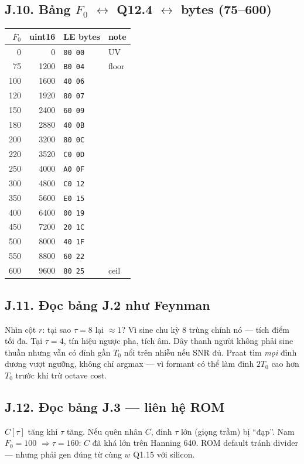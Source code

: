 \subsection*{J.10. Bảng $F_0$ $\leftrightarrow$ Q12.4 $\leftrightarrow$ bytes (75--600)}
\begin{center}\scriptsize
\begin{tabular}{@{}rrll@{}}
\toprule
$F_0$ & uint16 & LE bytes & note \\
\midrule
0 & 0 & \texttt{00 00} & UV \\
75 & 1200 & \texttt{B0 04} & floor \\
100 & 1600 & \texttt{40 06} &  \\
120 & 1920 & \texttt{80 07} &  \\
150 & 2400 & \texttt{60 09} &  \\
180 & 2880 & \texttt{40 0B} &  \\
200 & 3200 & \texttt{80 0C} &  \\
220 & 3520 & \texttt{C0 0D} &  \\
250 & 4000 & \texttt{A0 0F} &  \\
300 & 4800 & \texttt{C0 12} &  \\
350 & 5600 & \texttt{E0 15} &  \\
400 & 6400 & \texttt{00 19} &  \\
450 & 7200 & \texttt{20 1C} &  \\
500 & 8000 & \texttt{40 1F} &  \\
550 & 8800 & \texttt{60 22} &  \\
600 & 9600 & \texttt{80 25} & ceil \\
\bottomrule
\end{tabular}
\end{center}


\subsection*{J.11. Đọc bảng J.2 như Feynman}
Nhìn cột $r$: tại sao $\tau=8$ lại $\approx1$? Vì sine chu kỳ 8 trùng chính nó --- tích điểm tối đa. Tại $\tau=4$, tín hiệu ngược pha, tích âm. Dây thanh người không phải sine thuần nhưng vẫn có đỉnh gần $T_0$ nổi trên nhiễu nếu SNR đủ. Praat tìm \emph{mọi} đỉnh dương vượt ngưỡng, không chỉ argmax --- vì formant có thể làm đỉnh $2T_0$ cao hơn $T_0$ trước khi trừ octave cost.

\subsection*{J.12. Đọc bảng J.3 --- liên hệ ROM}
$C[\tau]$ tăng khi $\tau$ tăng. Nếu quên nhân $C$, đỉnh $\tau$ lớn (giọng trầm) bị ``đạp''. Nam $F_0=100$ $\Rightarrow\tau=160$: $C$ đã khá lớn trên Hanning 640. ROM default tránh divider --- nhưng phải gen đúng từ cùng $w$ Q1.15 với silicon.

